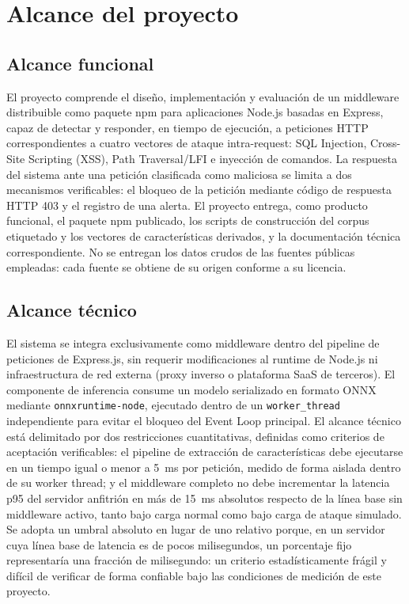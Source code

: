 \section{Alcance del proyecto}

\subsection{Alcance funcional}
El proyecto comprende el diseño, implementación y evaluación de un middleware distribuible
como paquete npm para aplicaciones Node.js basadas en Express, capaz de detectar y responder,
en tiempo de ejecución, a peticiones HTTP correspondientes a cuatro vectores de ataque
intra-request: SQL Injection, Cross-Site Scripting (XSS), Path Traversal/LFI e inyección de
comandos. La respuesta del sistema ante una petición clasificada como maliciosa se limita a dos
mecanismos verificables: el bloqueo de la petición mediante código de respuesta HTTP 403 y el
registro de una alerta. El proyecto entrega, como producto funcional, el paquete npm publicado, los
scripts de construcción del corpus etiquetado y los vectores de características derivados, y la
documentación técnica correspondiente. No se entregan los datos crudos de las fuentes públicas
empleadas: cada fuente se obtiene de su origen conforme a su licencia.

\subsection{Alcance técnico}
\label{subsec:alcance-tecnico}
El sistema se integra exclusivamente como middleware dentro del pipeline de peticiones de
Express.js, sin requerir modificaciones al runtime de Node.js ni infraestructura de red externa
(proxy inverso o plataforma SaaS de terceros). El componente de inferencia consume un modelo
serializado en formato ONNX mediante \texttt{onnxruntime-node}, ejecutado dentro de un
\texttt{worker\_thread} independiente para evitar el bloqueo del Event Loop principal. El alcance
técnico está delimitado por dos restricciones cuantitativas, definidas como criterios de aceptación
verificables: el pipeline de extracción de características debe ejecutarse en un tiempo igual o
menor a 5~ms por petición, medido de forma aislada dentro de su worker thread; y el middleware
completo no debe incrementar la latencia p95 del servidor anfitrión en más de 15~ms absolutos
respecto de la línea base sin middleware activo, tanto bajo carga normal como bajo carga de
ataque simulado. Se adopta un umbral absoluto en lugar de uno relativo porque, en un servidor
cuya línea base de latencia es de pocos milisegundos, un porcentaje fijo representaría una
fracción de milisegundo: un criterio estadísticamente frágil y difícil de verificar de forma
confiable bajo las condiciones de medición de este proyecto.

